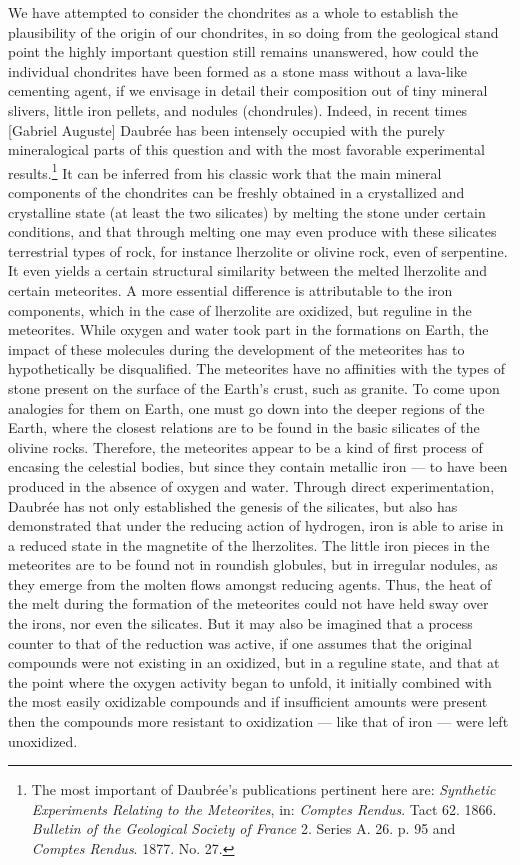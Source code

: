 \documentclass[a4paper, 12pt, oneside]{article}
\begin{document}
We have attempted to consider the chondrites as a whole to establish the plausibility of the origin of our chondrites, in so doing from the geological stand point the highly important question still remains unanswered, how could the individual chondrites have been formed as a stone mass without a lava-like cementing agent, if we envisage in detail their composition out of tiny mineral slivers, little iron pellets, and nodules (chondrules). Indeed, in recent times [Gabriel Auguste] Daubrée has been intensely occupied with the purely mineralogical parts of this question and with the most favorable experimental results.\footnote{The most important of Daubrée's publications pertinent here are: \emph{Synthetic Experiments Relating to the Meteorites}, in: \emph{Comptes Rendus}. Tact 62. 1866. \emph{Bulletin of the Geological Society of France} 2. Series A. 26. p. 95 and \emph{Comptes Rendus}. 1877. No. 27.} It can be inferred from his classic work that the main mineral components of the chondrites can be freshly obtained in a crystallized and crystalline state (at least the two silicates) by melting the stone under certain conditions, and that through melting one may even produce with these silicates terrestrial types of rock, for instance lherzolite or olivine rock, even of serpentine. It even yields a certain structural similarity between the melted lherzolite and certain meteorites. A more essential difference is attributable to the iron components, which in the case of lherzolite are oxidized, but reguline in the meteorites. While oxygen and water took part in the formations on Earth, the impact of these molecules during the development of the meteorites has to hypothetically be disqualified. The meteorites have no affinities with the types of stone present on the surface of the Earth's crust, such as granite. To come upon analogies for them on Earth, one must go down into the deeper regions of the Earth, where the closest relations are to be found in the basic silicates of the olivine rocks. Therefore, the meteorites appear to be a kind of first process of encasing the celestial bodies, but since they contain metallic iron --- to have been produced in the absence of oxygen and water. Through direct experimentation, Daubrée has not only established the genesis of the silicates, but also has demonstrated that under the reducing action of hydrogen, iron is able to arise in a reduced state in the magnetite of the lherzolites. The little iron pieces in the meteorites are to be found not in roundish globules, but in irregular nodules, as they emerge from the molten flows amongst reducing agents. Thus, the heat of the melt during the formation of the meteorites could not have held sway over the irons, nor even the silicates. But it may also be imagined that a process counter to that of the reduction was active, if one assumes that the original compounds were not existing in an oxidized, but in a reguline state, and that at the point where the oxygen activity began to unfold, it initially combined with the most easily oxidizable compounds and if insufficient amounts were present then the compounds more resistant to oxidization --- like that of iron --- were left unoxidized.
\end{document}

